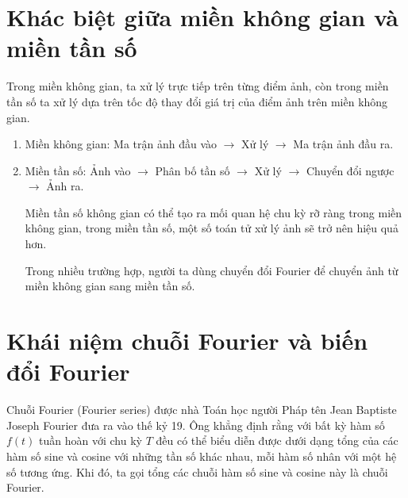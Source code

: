 \documentclass[12pt,a4paper]{report}
\numberwithin{equation}{section}
\theoremstyle{definition} %
\begin{document}
\section{Khác biệt giữa miền không gian và miền tần số}
Trong miền không gian, ta xử lý trực tiếp trên từng điểm ảnh, còn trong miền tần số ta xử lý dựa trên tốc độ thay đổi giá trị của điểm ảnh trên miền không gian.

\begin{enumerate}
    \item Miền không gian: Ma trận ảnh đầu vào $\rightarrow$ Xử lý $\rightarrow$ Ma trận ảnh đầu ra.

    \item Miền tần số: Ảnh vào $\rightarrow$ Phân bố tần số $\rightarrow$ Xử lý $\rightarrow$ Chuyển đổi ngược $\rightarrow$ Ảnh ra.

    Miền tần số không gian có thể tạo ra mối quan hệ chu kỳ rỡ ràng trong miền không gian, trong miền tần số, một số toán tử xử lý ảnh sẽ trở nên hiệu quả hơn.

    Trong nhiều trường hợp, người ta dùng chuyển đổi Fourier để chuyển ảnh từ miền không gian sang miền tần số.
\end{enumerate}
\section{Khái niệm chuỗi Fourier và biến đổi Fourier}

     Chuỗi Fourier (Fourier series) được nhà Toán học người Pháp tên Jean Baptiste Joseph Fourier đưa ra vào thế kỷ 19. Ông khẳng định rằng với bất kỳ hàm số $f(t)$ tuần hoàn với chu kỳ $T$ đều có thể biểu diễn được dưới dạng tổng của các hàm số sine và cosine với những tần số khác nhau, mỗi hàm số nhân với một hệ số tương ứng. Khi đó, ta gọi tổng các chuỗi hàm số sine và cosine này là chuỗi Fourier.
\end{document}
